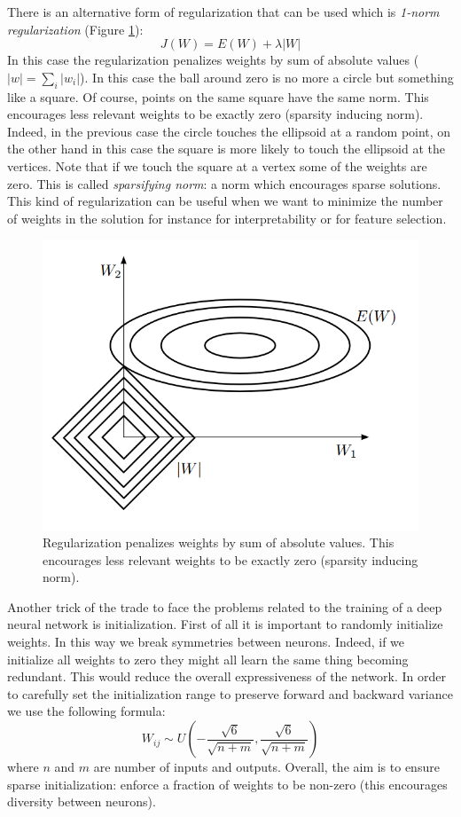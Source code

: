 There is an alternative form of regularization that can be used which is \textit{1-norm
regularization} (Figure \ref{fig::1NormRegularization}):
\[
	J(W) = E(W) + \lambda |W|
\]
In this case the regularization penalizes weights by sum of absolute values ($|w|
= \sum_{i}|w_{i}|$). In this case the ball around zero is no more a circle but something
like a square. Of course, points on the same square have the same norm. This
encourages less relevant weights to be exactly zero (sparsity inducing norm). Indeed,
in the previous case the circle touches the ellipsoid at a random point, on the other
hand in this case the square is more likely to touch the ellipsoid at the vertices.
Note that if we touch the square at a vertex some of the weights are zero. This is
called \textit{sparsifying norm}: a norm which encourages sparse solutions. This
kind of regularization can be useful when we want to minimize the number of
weights in the solution for instance for interpretability or for feature
selection.
\newline

\begin{figure}[H]
	\centering
	\includegraphics[scale=0.5]{
        images/16_DeepLearning_1Norm.png
    }
	\caption{Regularization penalizes weights by sum of absolute values. This encourages
	less relevant weights to be exactly zero (sparsity inducing norm).}
	\label{fig::1NormRegularization}
\end{figure}

Another trick of the trade to face the problems related to the training of a deep
neural network is initialization. First of all it is important to randomly
initialize weights. In this way we break symmetries between neurons. Indeed, if we
initialize all weights to zero they might all learn the same thing becoming redundant.
This would reduce the overall expressiveness of the network. In order to carefully
set the initialization range to preserve forward and backward variance we use the
following formula:
\[
	W_{ij}\sim U(- \frac{\sqrt{6}}{\sqrt{n+m}}, \frac{\sqrt{6}}{\sqrt{n+m}})
\]
where $n$ and $m$ are number of inputs and outputs. Overall, the aim is to
ensure sparse initialization: enforce a fraction of weights to be non-zero (this
encourages diversity between neurons).
\newline

